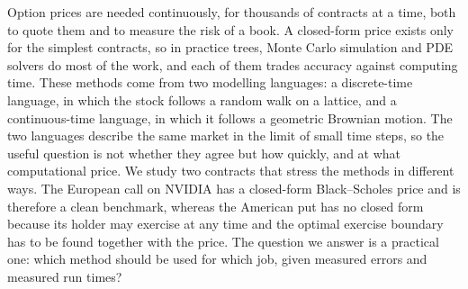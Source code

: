 Option prices are needed continuously, for thousands of contracts at a time, both to quote them and to measure the risk of a book.
A closed-form price exists only for the simplest contracts, so in practice trees, Monte Carlo simulation and PDE solvers do most of the work, and each of them trades accuracy against computing time.
These methods come from two modelling languages: a discrete-time language, in which the stock follows a random walk on a lattice, and a continuous-time language, in which it follows a geometric Brownian motion.
The two languages describe the same market in the limit of small time steps, so the useful question is not whether they agree but how quickly, and at what computational price.
We study two contracts that stress the methods in different ways.
The European call on NVIDIA has a closed-form Black--Scholes price and is therefore a clean benchmark, whereas the American put has no closed form because its holder may exercise at any time and the optimal exercise boundary has to be found together with the price.
The question we answer is a practical one: which method should be used for which job, given measured errors and measured run times?
